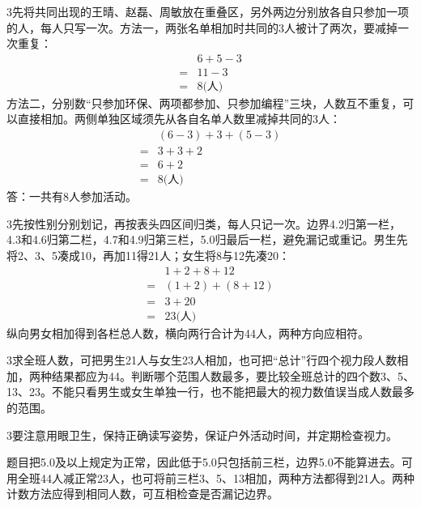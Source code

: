 \documentclass[multi=snippet,border={5bp 20bp 5bp 5bp}]{standalone}
\newenvironment{snippet}[3]{\begin{minipage}{#1bp}\color{answerred}\fontsize{#2}{#3}\selectfont\raggedright}{\end{minipage}}
\begin{document}
\begin{snippet}{505}{11.5}{14}\begin{multicols}{3}\raggedcolumns 先将共同出现的王晴、赵磊、周敏放在重叠区，另外两边分别放各自只参加一项的人，每人只写一次。方法一，两张名单相加时共同的3人被计了两次，要减掉一次重复：\[\begin{aligned}&6+5-3\\={}&11-3\\={}&8\text{(人)}\end{aligned}\]方法二，分别数“只参加环保、两项都参加、只参加编程”三块，人数互不重复，可以直接相加。两侧单独区域须先从各自名单人数里减掉共同的3人：\[\begin{aligned}&(6-3)+3+(5-3)\\={}&3+3+2\\={}&6+2\\={}&8\text{(人)}\end{aligned}\]答：一共有8人参加活动。\end{multicols}\end{snippet}
\begin{snippet}{505}{11.5}{14}\begin{multicols}{3}\raggedcolumns 先按性别分别划记，再按表头四区间归类，每人只记一次。边界4.2归第一栏，4.3和4.6归第二栏，4.7和4.9归第三栏，5.0归最后一栏，避免漏记或重记。男生先将2、3、5凑成10，再加11得21人；女生将8与12先凑20：\[\begin{aligned}&1+2+8+12\\={}&(1+2)+(8+12)\\={}&3+20\\={}&23\text{(人)}\end{aligned}\]纵向男女相加得到各栏总人数，横向两行合计为44人，两种方向应相符。\end{multicols}\end{snippet}
\begin{snippet}{505}{11.5}{14}\begin{multicols}{3}\raggedcolumns 求全班人数，可把男生21人与女生23人相加，也可把“总计”行四个视力段人数相加，两种结果都应为44。判断哪个范围人数最多，要比较全班总计的四个数3、5、13、23。不能只看男生或女生单独一行，也不能把最大的视力数值误当成人数最多的范围。\end{multicols}\end{snippet}
\begin{snippet}{505}{11.5}{14}\begin{multicols}{3}\raggedcolumns 要注意用眼卫生，保持正确读写姿势，保证户外活动时间，并定期检查视力。\par 题目把5.0及以上规定为正常，因此低于5.0只包括前三栏，边界5.0不能算进去。可用全班44人减正常23人，也可将前三栏3、5、13相加，两种方法都得到21人。两种计数方法应得到相同人数，可互相检查是否漏记边界。\end{multicols}\end{snippet}
\end{document}
